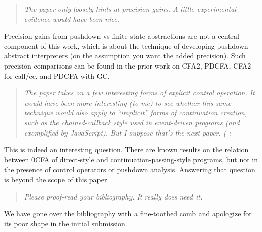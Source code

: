 \begin{titlepage}
\begin{quote}
\emph{The paper only loosely hints at precision gains. A little experimental
evidence would have been nice.}
\end{quote}

Precision gains from pushdown vs finite-state abstractions are not a
central component of this work, which is about the technique of
developing pushdown abstract interpreters (on the assumption you want
the added precision).  Such precision comparisons can be found in the
prior work on CFA2, PDCFA, CFA2 for call/cc, and PDCFA with GC.

\begin{quote}
\emph{
The paper takes on a few interesting forms of explicit control
  operation. It would have been more interesting (to me) to see
  whether this same technique would also apply to ``implicit'' forms of
  continuation creation, such as the chained-callback style used in
  event-driven programs (and exemplified by JavaScript). But I suppose
  that's the next paper. (-:}
\end{quote}

This is indeed an interesting question.  There are known results on
the relation between 0CFA of direct-style and
continuation-passing-style programs, but not in the presence of
control operators or pushdown analysis.  Answering that question is
beyond the scope of this paper.

\begin{quote}
\emph{
Please proof-read your bibliography. It really does need it.}
\end{quote}

We have gone over the bibliography with a fine-toothed comb and
apologize for its poor shape in the initial submission.



\end{titlepage}
